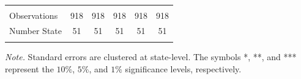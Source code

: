 \documentclass[dv_diss_main.tex]{subfiles}
\begin{document}
\begin{table}[H]
\begin{center}
{\begin{tabular}{lccccc}
    \vspace{4pt} & \begin{footnotesize}\end{footnotesize} & \begin{footnotesize}\end{footnotesize} & \begin{footnotesize}\end{footnotesize} & \begin{footnotesize}\end{footnotesize} & \begin{footnotesize}\end{footnotesize} \\
    Observations & 918 & 918 & 918 & 918 & 918 \\
    Number State & 51 & 51 & 51 & 51 & 51 \\
     \hline
     \\
    
    
    \end{tabular}
    }
    \label{tab:crowd_privcons}
    \end{center}
        
    \footnotesize{\textit{Note. }Standard errors are clustered at state-level. The symbols *, **, and *** represent the $10\%$, $5\%$, and $1\%$ significance levels, respectively.}

\end{table}
\end{document}
